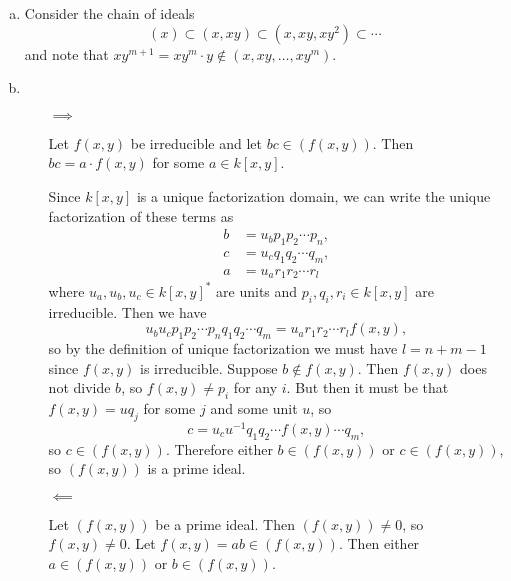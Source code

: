 \documentclass{article}
\begin{document}
\begin{Answer}
  \begin{enumerate}[(a)]
    \item{
      Consider the chain of ideals
      $$
      (x) \subset (x, xy) \subset (x, xy, xy^2) \subset \cdots
      $$
      and note that $xy^{m+1} = xy^m \cdot y \notin (x, xy, \dots, xy^m)$.
    }
    \item{
      \begin{itemize}
        \item[$\implies$]{
          Let $f(x,y)$ be irreducible and let $bc \in (f(x,y))$. Then
          $bc = a \cdot f(x,y)$ for some $a \in k[x,y]$.

          Since $k[x,y]$ is a unique factorization domain, we can
          write the unique factorization of these terms as
          \begin{align*}
            b &= u_b p_1 p_2 \cdots p_n, \\
            c &= u_c q_1 q_2 \cdots q_m, \\
            a &= u_a r_1 r_2 \cdots r_l
          \end{align*}
          where $u_a, u_b, u_c \in k[x,y]^\ast$ are units and
          $p_i, q_i, r_i \in k[x,y]$ are irreducible. Then we have
          $$
            u_b u_c p_1 p_2 \cdots p_n q_1 q_2 \cdots q_m
          = u_a r_1 r_2 \cdots r_l f(x,y),
          $$
          so by the definition of unique factorization we must have
          $l =  n + m - 1$ since $f(x,y)$ is irreducible.
          Suppose $b \notin f(x,y)$. Then $f(x,y)$ does not divide
          $b$, so $f(x,y) \neq p_i$ for any $i$. But then it must be
          that $f(x,y) = u q_j$ for some $j$ and some unit $u$, so
          $$
          c = u_c u^{-1} q_1 q_2 \cdots f(x,y) \cdots q_m,
          $$
          so $c \in (f(x,y))$. Therefore either
          $b \in (f(x,y))$ or $c \in (f(x,y))$,
          so $(f(x,y))$ is a prime ideal.
        }
        \item[$\impliedby$]{
          Let $(f(x,y))$ be a prime ideal. Then $(f(x,y)) \neq 0$, so
          $f(x,y) \neq 0$. Let $f(x,y) = ab \in (f(x,y))$.
          Then either $a \in (f(x,y))$ or $b \in (f(x,y))$.

}
\end{itemize}}
\end{enumerate}
\end{Answer}
\end{document}
